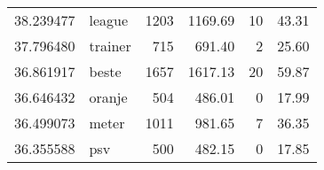 \begin{table}[h]
\begin{tabular}{rlrrrr}
     38.239477 &       league &              1203 &            1169.69 &                10 &              43.31 \\
     37.796480 &      trainer &               715 &             691.40 &                 2 &              25.60 \\
     36.861917 &        beste &              1657 &            1617.13 &                20 &              59.87 \\
     36.646432 &       oranje &               504 &             486.01 &                 0 &              17.99 \\
     36.499073 &        meter &              1011 &             981.65 &                 7 &              36.35 \\
     36.355588 &          psv &               500 &             482.15 &                 0 &              17.85 \\
\bottomrule
\end{tabular}

\end{table}
